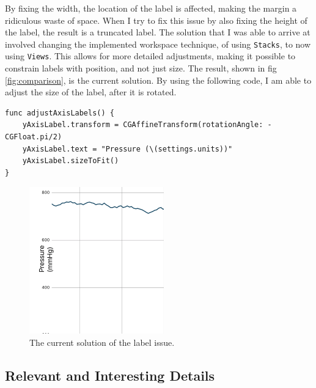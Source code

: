 \documentclass[onecolumn, draftclsnofoot,10pt, compsoc]{IEEEtran}
\begin{document}
By fixing the width, the location of the label is affected, making the margin a ridiculous waste of space.
When I try to fix this issue by also fixing the height of the label, the result is a truncated label.
The solution that I was able to arrive at involved changing the implemented workspace technique, of using \texttt{Stacks}, to now using \texttt{Views}.
This allows for more detailed adjustments, making it possible to constrain labels with position, and not just size.
The result, shown in fig \ref{fig:comparison}, is the current solution.
By using the following code, I am able to adjust the size of the label, after it is rotated.

\begin{lstlisting}
func adjustAxisLabels() {
    yAxisLabel.transform = CGAffineTransform(rotationAngle: -CGFloat.pi/2)
    yAxisLabel.text = "Pressure (\(settings.units))"
    yAxisLabel.sizeToFit()
}
\end{lstlisting}

\begin{figure}[H]
  \centering
  \includegraphics[width=.3\linewidth]{solution}
  \caption{The current solution of the label issue.}
  \label{fig:solution}
\end{figure}

\subsection{Relevant and Interesting Details}
\end{document}
